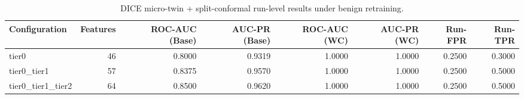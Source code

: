 \begin{table}[t]
\centering
\caption{DICE micro-twin + split-conformal run-level results under benign retraining.}
\label{tab:dice_full_overall}
\footnotesize
\begin{tabular}{lrrrrrrr}
\toprule
Configuration & Features & ROC-AUC (Base) & AUC-PR (Base) & ROC-AUC (WC) & AUC-PR (WC) & Run-FPR & Run-TPR \\
\midrule
tier0 & 46 & 0.8000 & 0.9319 & 1.0000 & 1.0000 & 0.2500 & 0.3000 \\
tier0_tier1 & 57 & 0.8375 & 0.9570 & 1.0000 & 1.0000 & 0.2500 & 0.5000 \\
tier0_tier1_tier2 & 64 & 0.8500 & 0.9620 & 1.0000 & 1.0000 & 0.2500 & 0.5000 \\
\bottomrule
\end{tabular}

\end{table}
